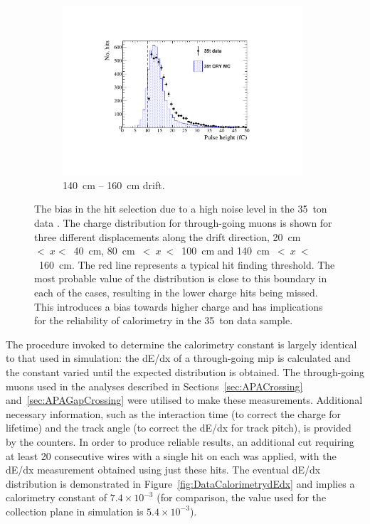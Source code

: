 \begin{figure}
\begin{subfigure}[t]{0.32\linewidth}
    \includegraphics[width=0.98\textwidth]{HitReconstructionBias140-160.pdf}
    \caption{140~cm -- 160~cm drift.}
    \label{fig:DataCalorimetryThreshold3}
  \end{subfigure}
  \caption[The bias in the hit selection due to a high noise level in the 35~ton data.]{The bias in the hit selection due to a high noise level in the 35~ton data \cite{Brailsford2016}.  The charge distribution for through-going muons is shown for three different displacements along the drift direction, 20~cm~$<~x<$~40~cm, 80~cm~$<~x~<$~100~cm and 140~cm~$<~x~<$~160~cm.  The red line represents a typical hit finding threshold.  The most probable value of the distribution is close to this boundary in each of the cases, resulting in the lower charge hits being missed.  This introduces a bias towards higher charge and has implications for the reliability of calorimetry in the 35~ton data sample.}
  \label{fig:DataCalorimetryThreshold}
\end{figure}

The procedure invoked to determine the calorimetry constant is largely identical to that used in simulation: the dE/dx of a through-going mip is calculated and the constant varied until the expected distribution is obtained.  The through-going muons used in the analyses described in Sections~\ref{sec:APACrossing} and~\ref{sec:APAGapCrossing} were utilised to make these measurements.  Additional necessary information, such as the interaction time (to correct the charge for lifetime) and the track angle (to correct the dE/dx for track pitch), is provided by the counters.  In order to produce reliable results, an additional cut requiring at least 20 consecutive wires with a single hit on each was applied, with the dE/dx measurement obtained using just these hits.  The eventual dE/dx distribution is demonstrated in Figure~\ref{fig:DataCalorimetrydEdx} and implies a calorimetry constant of $7.4\times10^{-3}$ (for comparison, the value used for the collection plane in simulation is $5.4\times10^{-3}$).

